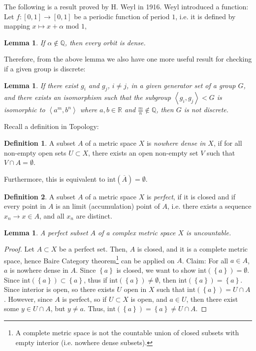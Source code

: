 \documentclass[12pt,oneside]{sfsuthesis}
\theoremstyle{plain} %
\newtheorem{lemma}[theorem]{Lemma}
\theoremstyle{definition}  %
\newtheorem{definition}{Definition}[chapter]
\theoremstyle{remark}  %
\theoremstyle{plain}
\begin{document}
{The following is a result proved by H. Weyl in 1916. Weyl introduced a function: Let $f:[0,1]\longrightarrow [0,1]$ be a periodic function of period $1$, i.e. it is defined by mapping $x\mapsto x+\alpha \text{ mod } 1$,
\begin{lemma}\cite[Proposition 4.12]{series2008hyperbolic}
If $\alpha\notin \mathbb{Q}$, then every orbit is dense.
\end{lemma}

Therefore, from the above lemma we also have one more useful result for checking if a given group is discrete:
\begin{lemma}
If there exist $g_i$ and $g_j$, $i\neq j$, in a given generator set of a group $G$, and there exists an isomorphism such that the subgroup $\left\langle g_i,g_j\right\rangle<G$ is isomorphic to $\left\langle a^m,b^n\right\rangle$ where $a,b\in\mathbb{R}$ and $\frac{m}{n}\notin\mathbb{Q}$, then $G$ is not discrete.
\end{lemma}


Recall a definition in Topology:
\begin{definition}\cite{series2008hyperbolic}
A subset $A$ of a metric space $X$ is \textit{nowhere dense in $X$}, if for all non-empty open sets $U\subset X$, there exists an open non-empty set $V$ such that $V\cap A=\emptyset$. 
\end{definition}
Furthermore, this is equivalent to $\text{int}(\overline{A})=\emptyset$.

\begin{definition}\cite{series2008hyperbolic}
A subset $A$ of a metric space $X$ is \textit{perfect}, if it is closed and if every point in $A$ is an limit (accumulation) point of $A$, i.e. there exists a sequence $x_n\to x\in A$, and all $x_n$ are distinct.
\end{definition}

\begin{lemma}\cite{series2008hyperbolic}\label{Baire}
A perfect subset $A$ of a complex metric space $X$ is uncountable.
\end{lemma}
\begin{proof}
Let $A\subset X$ be a perfect set. Then, $A$ is closed, and it is a complete metric space, hence Baire Category theorem\footnote{A complete metric space is not the countable union of closed subsets with
empty interior (i.e. nowhere dense subsets)\cite[Theorem 6.76]{axler2021measure}.} can be applied on $A$. Claim: For all $a\in A$, $a$ is nowhere dense in $A$. Since $\left\lbrace a\right\rbrace$ is closed, we want to show $\text{int}(\left\lbrace a \right\rbrace)=\emptyset$. Since $\text{int}(\left\lbrace a \right\rbrace)\subset \left\lbrace a\right\rbrace$, thus if $\text{int}(\left\lbrace a \right\rbrace)\neq \emptyset$, then $\text{int}(\left\lbrace a \right\rbrace)=\left\lbrace a \right\rbrace$. Since interior is open, so there exists $U$ open in $X$ such that $\text{int}(\left\lbrace a \right\rbrace)=U \cap A$. However, since $A$ is perfect, so if $U\subset X$ is open, and $a\in U$, then there exist some $y \in U \cap A$, but $y\neq a$. Thus, $\text{int}(\left\lbrace a \right\rbrace)=\left\lbrace a \right\rbrace\neq U \cap A$.
\end{proof}


}
\end{document}
